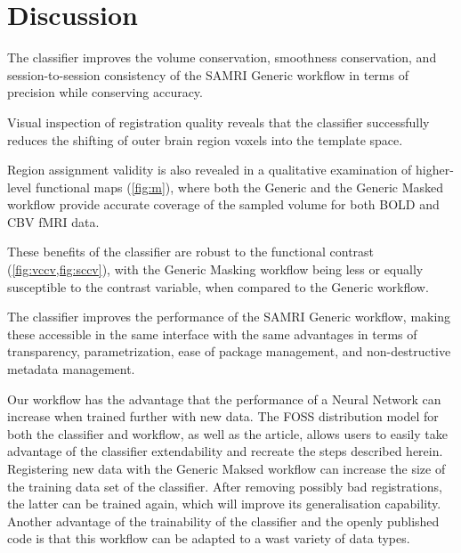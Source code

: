 \section{Discussion}

The classifier improves the volume conservation, smoothness conservation, and session-to-session consistency of the SAMRI Generic workflow in terms of precision while conserving accuracy.

Visual inspection of registration quality reveals that the classifier successfully reduces the shifting of outer brain region voxels into the template space.

Region assignment validity is also revealed in a qualitative examination of higher-level functional maps (\cref{fig:m}), where both the Generic and the Generic Masked workflow provide accurate coverage of the sampled volume for both BOLD and CBV fMRI data.

These benefits of the classifier are robust to the functional contrast (\cref{fig:vccv,fig:sccv}), with the Generic Masking workflow being less or equally susceptible to the contrast variable, when compared to the Generic workflow.

The classifier improves the performance of the SAMRI Generic workflow, making these accessible in the same interface with the same advantages in terms of transparency, parametrization, ease of package management, and non-destructive metadata management.

Our workflow has the advantage that the performance of a Neural Network can increase when trained further with new data.
The FOSS distribution model for both the classifier and workflow, as well as the article, allows users to easily take advantage of the classifier extendability and recreate the steps described herein.
Registering new data with the Generic Maksed workflow can increase the size of the training data set of the classifier.
After removing possibly bad registrations, the latter can be trained again, which will improve its generalisation capability.
Another advantage of the trainability of the classifier and the openly published code is that this workflow can be adapted to a wast variety of data types.

